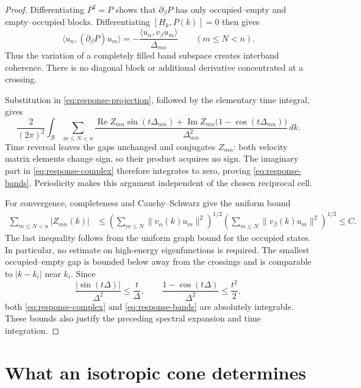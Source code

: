 \documentclass[11pt,a4paper]{article}
\DeclareMathOperator{\Rea}{Re}
\DeclareMathOperator{\Ima}{Im}
\theoremstyle{remark}
\numberwithin{equation}{section}
\begin{document}
\begin{proof}
Differentiating $P^2=P$ shows that $\partial_\beta P$ has only
occupied--empty and empty--occupied blocks. Differentiating
$[H_k,P(k)]=0$ then gives
\begin{equation}\label{eq:P-matrix}
 \langle u_n,(\partial_\beta P)u_m\rangle
     =-\frac{\langle u_n,v_\beta u_m\rangle}{\Delta_{mn}}
 \qquad(m\le N<n).
\end{equation}
Thus the variation of a completely filled band subspace creates
interband coherence. There is no diagonal block or additional
derivative concentrated at a crossing.

Substitution in \eqref{eq:response-projection}, followed by the
elementary time integral, gives
\begin{equation}\label{eq:response-complex}
 \frac{2}{(2\pi)^2}\int_{\mathcal B}\sum_{m\le N<n}
 \frac{\Rea Z_{mn}\sin(t\Delta_{mn})
       +\Ima Z_{mn}\bigl(1-\cos(t\Delta_{mn})\bigr)}
      {\Delta_{mn}^2}\,dk.
\end{equation}
Time reversal leaves the gaps unchanged and conjugates $Z_{mn}$:
both velocity matrix elements change sign, so their product acquires
no sign. The imaginary part in \eqref{eq:response-complex} therefore
integrates to zero, proving \eqref{eq:response-bands}. Periodicity
makes this argument independent of the chosen reciprocal cell.

For convergence, completeness and Cauchy--Schwarz give the uniform
bound
\begin{equation}\label{eq:sum-bound}
 \begin{aligned}
 \sum_{m\le N<n}|Z_{mn}(k)|
 &\le
 \left(\sum_{m\le N}\|v_\alpha(k)u_m\|^2\right)^{1/2}
 \left(\sum_{m\le N}\|v_\beta(k)u_m\|^2\right)^{1/2}
 \le C.
 \end{aligned}
\end{equation}
The last inequality follows from the uniform graph bound for the
occupied states. In particular, no estimate on high-energy
eigenfunctions is required. The smallest occupied--empty gap is
bounded below away from the crossings and is comparable to
$|k-k_i|$ near $k_i$. Since
\[
 \frac{|\sin(t\Delta)|}{\Delta^2}\le\frac{t}{\Delta},
 \qquad
 \frac{1-\cos(t\Delta)}{\Delta^2}\le\frac{t^2}{2},
\]
both \eqref{eq:response-complex} and \eqref{eq:response-bands} are
absolutely integrable. These bounds also justify the preceding
spectral expansion and time integration.
\end{proof}

\section{What an isotropic cone determines}\label{sec:geometry}
\end{document}
